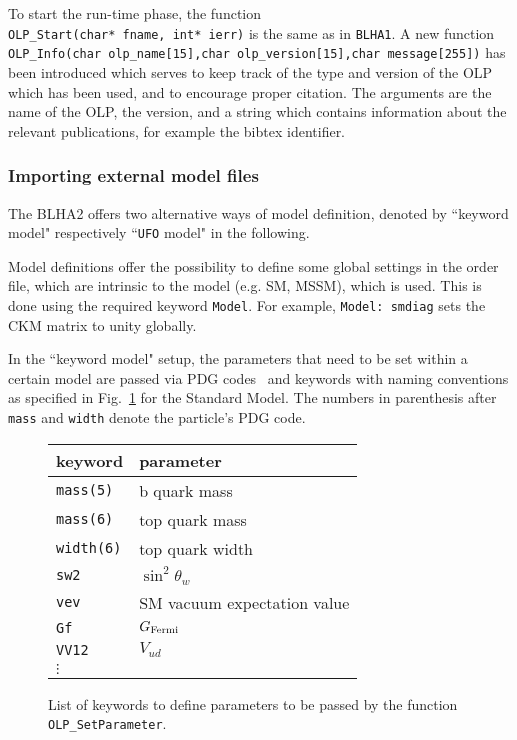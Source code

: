 To start the run-time phase, the function\\
 {\tt OLP\_Start(char* fname, int* ierr)} is the same  as in {\tt BLHA1}.
A new function\\
{\tt \small OLP\_Info(char olp\_name[15],char olp\_version[15],char message[255])} 
has been introduced
which serves to keep track of the type and version of the OLP which has been used,
and to encourage proper citation. 
The arguments are the name of the OLP, the version, and a string which  
contains information about
the relevant publications, for example the bibtex identifier.

\subsubsection{Importing external model files}

The BLHA2 offers two alternative ways of model definition, denoted by 
``keyword model" respectively ``{\tt UFO} model" in the following.

Model definitions offer the possibility to define some global settings 
in the order file, which are intrinsic to the model (e.g. SM, MSSM), which 
is used.
This is done using the required keyword {\tt Model}.
For example, {\tt Model: smdiag} sets the CKM matrix to unity globally.

In the ``keyword model" setup, 
the parameters that need to be set within a certain model 
are passed via PDG codes~\cite{Beringer:1900zz} and keywords 
with naming
conventions as specified in Fig.~\ref{tab:keywords:static} for the Standard
Model. The numbers in parenthesis after {\tt mass} and {\tt width}  denote
the particle's PDG code.

\begin{figure}[htb]
\begin{tabular}{|l|l|}
\hline
keyword & parameter\\
\hline
{\tt mass(5)} & b quark mass \\
{\tt mass(6)} & top quark mass \\
{\tt width(6)} & top quark width\\
{\tt sw2}& $\sin^2\theta_w$\\
{\tt vev}& SM vacuum expectation value\\
{\tt Gf} & $G_{\rm{Fermi}}$\\
{\tt VV12}& $V_{ud}$\\
$\vdots$ & \\
\hline
\end{tabular}
\caption{List of keywords to define parameters to be passed by the function {\tt
OLP\_SetParameter}.}
\label{tab:keywords:static}
\end{figure}


